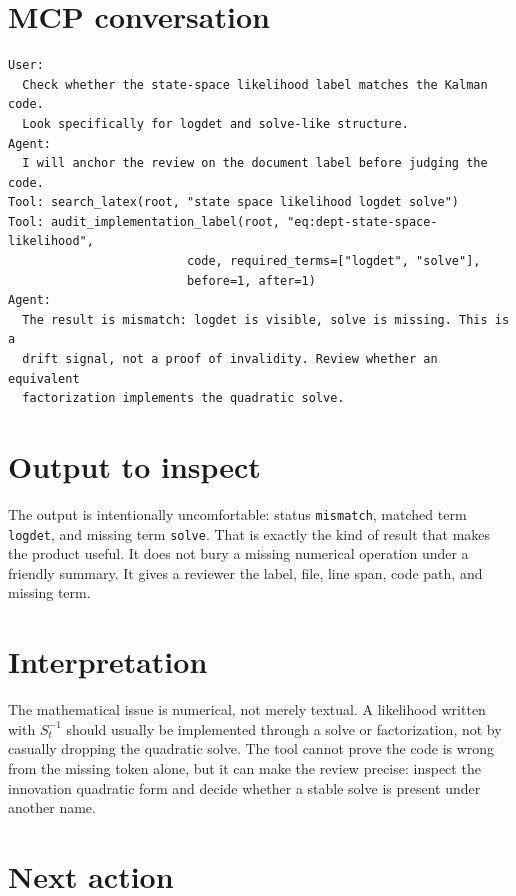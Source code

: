 \documentclass[12pt,a4paper,openany]{book}
\begin{document}
\section*{MCP conversation}

\begin{lstlisting}[basicstyle=\ttfamily\scriptsize]
User:
  Check whether the state-space likelihood label matches the Kalman code.
  Look specifically for logdet and solve-like structure.
Agent:
  I will anchor the review on the document label before judging the code.
Tool: search_latex(root, "state space likelihood logdet solve")
Tool: audit_implementation_label(root, "eq:dept-state-space-likelihood",
                         code, required_terms=["logdet", "solve"],
                         before=1, after=1)
Agent:
  The result is mismatch: logdet is visible, solve is missing. This is a
  drift signal, not a proof of invalidity. Review whether an equivalent
  factorization implements the quadratic solve.
\end{lstlisting}



\section*{Output to inspect}

The output is intentionally uncomfortable: status \texttt{mismatch}, matched
term \texttt{logdet}, and missing term \texttt{solve}. That is exactly the kind of result that
makes the product useful. It does not bury a missing numerical operation under a
friendly summary. It gives a reviewer the label, file, line span, code path, and
missing term.

\section*{Interpretation}

The mathematical issue is numerical, not merely textual. A likelihood written
with \(S_t^{-1}\) should usually be implemented through a solve or factorization,
not by casually dropping the quadratic solve. The tool cannot prove the code is
wrong from the missing token alone, but it can make the review precise: inspect
the innovation quadratic form and decide whether a stable solve is present under
another name.

\section*{Next action}
\end{document}
